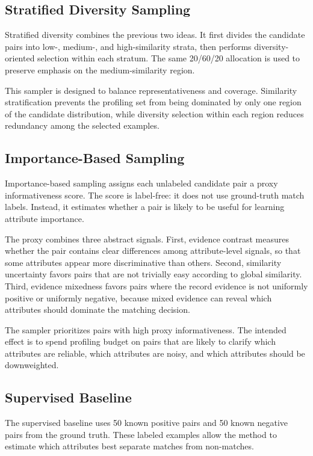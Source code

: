 \documentclass[11pt]{article}
\begin{document}
\subsection{Stratified Diversity Sampling}

Stratified diversity combines the previous two ideas. It first divides the candidate pairs into low-, medium-, and high-similarity strata, then performs diversity-oriented selection within each stratum. The same 20/60/20 allocation is used to preserve emphasis on the medium-similarity region.

This sampler is designed to balance representativeness and coverage. Similarity stratification prevents the profiling set from being dominated by only one region of the candidate distribution, while diversity selection within each region reduces redundancy among the selected examples.

\subsection{Importance-Based Sampling}

Importance-based sampling assigns each unlabeled candidate pair a proxy informativeness score. The score is label-free: it does not use ground-truth match labels. Instead, it estimates whether a pair is likely to be useful for learning attribute importance.

The proxy combines three abstract signals. First, evidence contrast measures whether the pair contains clear differences among attribute-level signals, so that some attributes appear more discriminative than others. Second, similarity uncertainty favors pairs that are not trivially easy according to global similarity. Third, evidence mixedness favors pairs where the record evidence is not uniformly positive or uniformly negative, because mixed evidence can reveal which attributes should dominate the matching decision.

The sampler prioritizes pairs with high proxy informativeness. The intended effect is to spend profiling budget on pairs that are likely to clarify which attributes are reliable, which attributes are noisy, and which attributes should be downweighted.

\subsection{Supervised Baseline}

The supervised baseline uses 50 known positive pairs and 50 known negative pairs from the ground truth. These labeled examples allow the method to estimate which attributes best separate matches from non-matches.
\end{document}
